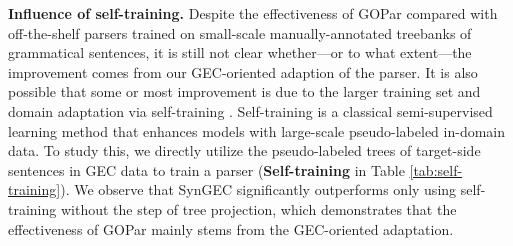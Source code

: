 \documentclass[11pt]{article}
\begin{document}
\begin{table}[tp!]
\centering
{}
\caption{Comparison with the self-training method.
}
\label{tab:self-training}
\end{table} 
\textbf{Influence of self-training.} Despite the effectiveness of GOPar compared with off-the-shelf parsers trained on small-scale manually-annotated treebanks of grammatical sentences, it is still not clear whether---or to what extent---the improvement comes from our GEC-oriented adaption of the parser. It is also possible that some or most improvement is due to the larger training set and domain adaptation via self-training \cite{DBLP:conf/naacl/McCloskyCJ06}. Self-training is a classical semi-supervised learning method that enhances models with large-scale pseudo-labeled in-domain data. To study this, we directly utilize the pseudo-labeled trees of target-side sentences in GEC data to train a parser (\textbf{Self-training} in Table \ref{tab:self-training}). We observe that SynGEC significantly outperforms only using self-training without the step of tree projection, which demonstrates that the effectiveness of GOPar mainly stems from the GEC-oriented adaptation.
\end{document}
